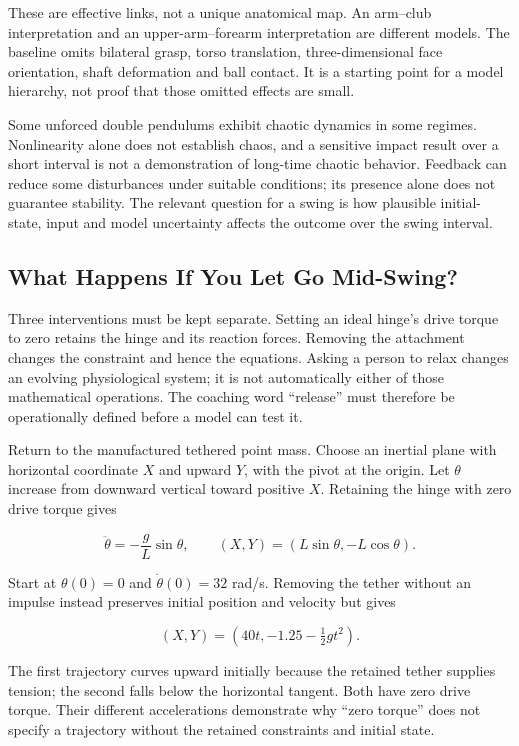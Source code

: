 These are effective links, not a unique anatomical map. An arm--club interpretation and an upper-arm--forearm interpretation are different models. The baseline omits bilateral grasp, torso translation, three-dimensional face orientation, shaft deformation and ball contact. It is a starting point for a model hierarchy, not proof that those omitted effects are small.

Some unforced double pendulums exhibit chaotic dynamics in some regimes. Nonlinearity alone does not establish chaos, and a sensitive impact result over a short interval is not a demonstration of long-time chaotic behavior. Feedback can reduce some disturbances under suitable conditions; its presence alone does not guarantee stability. The relevant question for a swing is how plausible initial-state, input and model uncertainty affects the outcome over the swing interval.

\subsection{What Happens If You Let Go Mid-Swing?}\label{ch01:what-happens-if-you-let-go-mid-swing}

Three interventions must be kept separate. Setting an ideal hinge's drive torque to zero retains the hinge and its reaction forces. Removing the attachment changes the constraint and hence the equations. Asking a person to relax changes an evolving physiological system; it is not automatically either of those mathematical operations. The coaching word ``release'' must therefore be operationally defined before a model can test it.

Return to the manufactured tethered point mass. Choose an inertial plane with horizontal coordinate \(X\) and upward \(Y\), with the pivot at the origin. Let \(\theta\) increase from downward vertical toward positive \(X\). Retaining the hinge with zero drive torque gives

\[
\ddot\theta=-\frac{g}{L}\sin\theta,\qquad
(X,Y)=(L\sin\theta,-L\cos\theta).
\]

Start at \(\theta(0)=0\) and \(\dot\theta(0)=32\) rad/s. Removing the tether without an impulse instead preserves initial position and velocity but gives

\[
(X,Y)=(40t,-1.25-\tfrac12gt^2).
\]

The first trajectory curves upward initially because the retained tether supplies tension; the second falls below the horizontal tangent. Both have zero drive torque. Their different accelerations demonstrate why ``zero torque'' does not specify a trajectory without the retained constraints and initial state.

